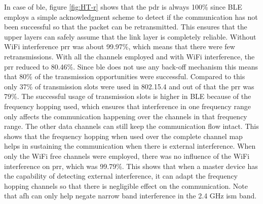 In case of \gls{ble}, figure \ref{fig:HT-r} shows that the \gls{pdr} is always 100\% since BLE employs a simple acknowledgment scheme to detect if the communication has not been successful so that the packet can be retransmitted. This ensures that the upper layers can safely assume that the link layer is completely reliable. Without WiFi interference \gls{prr} was about 99.97\%, which means that there were few retransmissions. With all the channels employed and with WiFi interference, the \gls{prr} reduced to 80.46\%. Since \gls{ble} does not use any back-off mechanism this means that 80\% of the transmission opportunities were successful. Compared to this only 37\% of transmission slots were used in 802.15.4 and out of that the \gls{prr} was 79\%.  The successful usage of transmission slots is higher in BLE because of the frequency hopping used, which ensures that interference in one frequency range only affects the communication happening over the channels in that frequency range. The other data channels can still keep the communication flow intact. This shows that the frequency hopping when used over the complete channel map helps in sustaining the communication when there is external interference. When only the WiFi free channels were employed, there was no influence of the WiFi interference on \gls{prr}, which was 99.79\%. This shows that when a master device has the capability of detecting external interference, it can adapt the frequency hopping channels so that there is negligible effect on the communication. Note that \gls{afh} can only help negate narrow band interference in the 2.4 GHz \gls{ism} band.
%
%
